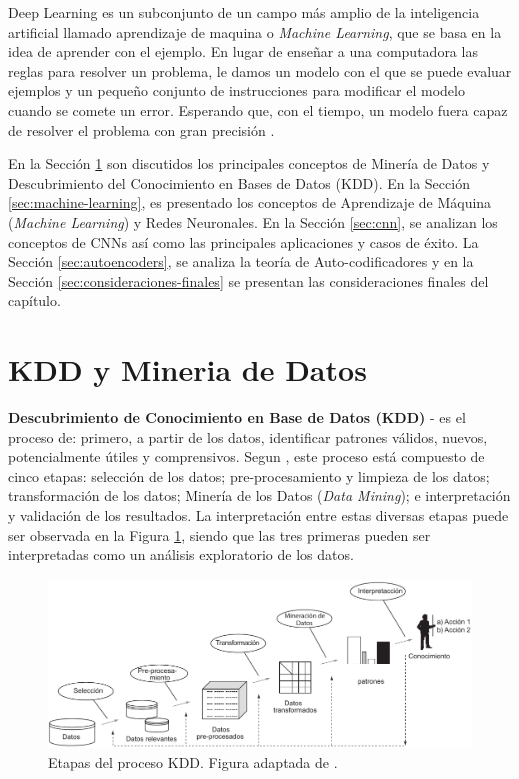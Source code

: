 Deep Learning es un subconjunto de un campo más amplio de la inteligencia artificial llamado aprendizaje de maquina o \textit{Machine Learning}, que se basa en la idea de aprender con el ejemplo. En lugar de enseñar a una computadora las reglas para resolver un problema, le damos un modelo con el que se puede evaluar ejemplos y un pequeño conjunto de instrucciones para modificar el modelo cuando se comete un error. Esperando que, con el tiempo, un modelo fuera capaz de resolver el problema con gran precisión \cite{dlBook}.

 
 En la Sección \ref{sec:kdd-datamining} son discutidos los principales conceptos de Minería de Datos y Descubrimiento del Conocimiento en Bases de Datos (KDD). En la Sección \ref{sec:machine-learning}, es  presentado los conceptos de Aprendizaje de Máquina  (\textit{Machine Learning}) y Redes Neuronales. En la Sección \ref{sec:cnn}, se analizan los conceptos de  \acf{CNNs} así como las principales  aplicaciones y casos de éxito. La Sección \ref{sec:autoencoders}, se analiza la teoría de Auto-codificadores y en la Sección \ref{sec:consideraciones-finales} se presentan las consideraciones finales del capítulo.


\section{KDD y Mineria de Datos}\label{sec:kdd-datamining}

\textbf{Descubrimiento de Conocimiento en Base de Datos (KDD)} - es el proceso de: primero, a partir de los datos, identificar patrones válidos, nuevos, potencialmente útiles y comprensivos. Segun  \cite{Fayyad:1996:DMK:257938.257942}, este proceso está compuesto de cinco etapas: selección de los datos; pre-procesamiento y limpieza de los datos; transformación de los datos; Minería de los Datos (\textit{Data Mining}); e interpretación y validación de los resultados. La interpretación entre estas diversas etapas puede ser observada en la Figura \ref{fig:processoKDD}, siendo que las tres primeras pueden ser interpretadas como un análisis exploratorio de los datos.

\begin{figure}[htp]
\centering
\includegraphics[width=0.99\columnwidth]{chapter3/KDD-process.pdf}
\caption{Etapas del proceso KDD. Figura adaptada de \cite{Fayyad:1996:DMK:257938.257942}.}
\label{fig:processoKDD}
\end{figure}


